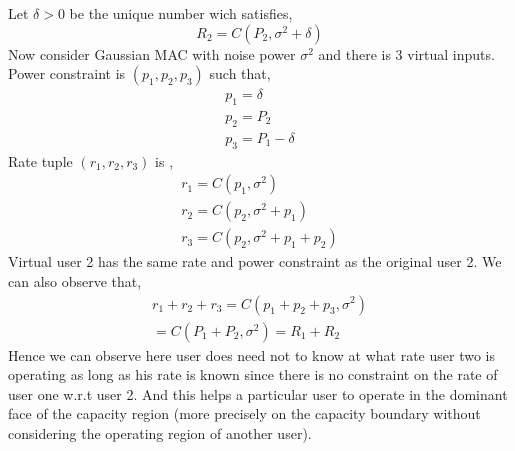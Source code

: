 \documentclass{article}
\begin{document}
 Let $\delta>0$ be the unique number wich satisfies,
\begin{equation}
	R_2 = C(P_2, \sigma^2 + \delta)
\end{equation}
Now consider Gaussian MAC with noise power $\sigma^2$ and there is 3 virtual inputs. Power constraint is $(p_1,p_2,p_3)$ such that, 
\begin{align*}
	p_1 = \delta\\ p_2 = P_2 \\ p_3 = P_1 -\delta
\end{align*}
Rate tuple $\left( r_1, r_2, r_3\right)$ is ,
\begin{align*}
	r_1 = C(p_1,  \sigma^2)\\ r_2 = C (p_2, \sigma^2 +p_1) \\r_3 =C (p_2, \sigma^2 +p_1+p_2)
\end{align*}
Virtual user 2 has the same rate and power constraint as the original user 2. We can also observe that,
\begin{align*}
	r_1 +r_2 +r_3 = C(p_1+p_2 +p_3,  \sigma^2)\\  = C (P_1 +P_2, \sigma^2 ) = R_1 +R_2
\end{align*}
Hence we can observe here user does need not to know at what rate user two is operating as long as his rate is known since there is no constraint on the rate of user one w.r.t user 2. And this helps a particular user to operate in the dominant face of the capacity region (more precisely on the capacity boundary without considering the operating region of another user). \newline 
\end{document}
